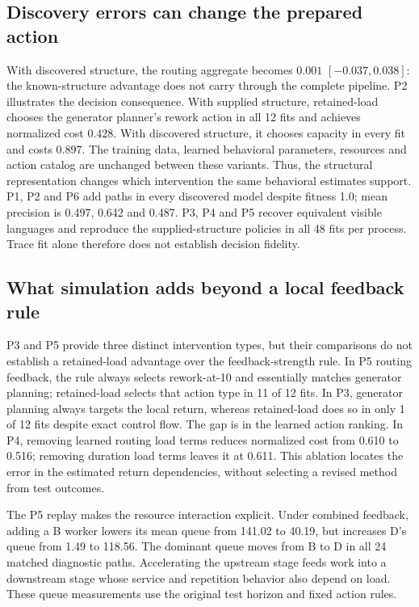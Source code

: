 \subsection{Discovery errors can change the prepared action}
With discovered structure, the routing aggregate becomes $0.001$ $[-0.037,0.038]$: the known-structure advantage does not carry through the complete pipeline. P2 illustrates the decision consequence. With supplied structure, retained-load chooses the generator planner's rework action in all 12 fits and achieves normalized cost 0.428. With discovered structure, it chooses capacity in every fit and costs 0.897. The training data, learned behavioral parameters, resources and action catalog are unchanged between these variants. Thus, the structural representation changes which intervention the same behavioral estimates support. P1, P2 and P6 add paths in every discovered model despite fitness 1.0; mean precision is 0.497, 0.642 and 0.487. P3, P4 and P5 recover equivalent visible languages and reproduce the supplied-structure policies in all 48 fits per process. Trace fit alone therefore does not establish decision fidelity.

\subsection{What simulation adds beyond a local feedback rule}
P3 and P5 provide three distinct intervention types, but their comparisons do not establish a retained-load advantage over the feedback-strength rule. In P5 routing feedback, the rule always selects rework-at-10 and essentially matches generator planning; retained-load selects that action type in 11 of 12 fits. In P3, generator planning always targets the local return, whereas retained-load does so in only 1 of 12 fits despite exact control flow. The gap is in the learned action ranking. In P4, removing learned routing load terms reduces normalized cost from 0.610 to 0.516; removing duration load terms leaves it at 0.611. This ablation locates the error in the estimated return dependencies, without selecting a revised method from test outcomes.

The P5 replay makes the resource interaction explicit. Under combined feedback, adding a B worker lowers its mean queue from 141.02 to 40.19, but increases D's queue from 1.49 to 118.56. The dominant queue moves from B to D in all 24 matched diagnostic paths. Accelerating the upstream stage feeds work into a downstream stage whose service and repetition behavior also depend on load. These queue measurements use the original test horizon and fixed action rules.

